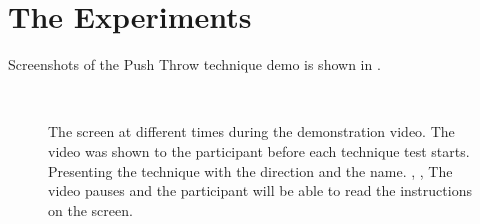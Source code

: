 \section*{The Experiments} \label{sec:experiments}

Screenshots of the Push Throw technique demo is shown in .

\begin{figure}[H]
\\
\caption{The screen at different times during the demonstration video. The video was shown to the participant before each technique test starts. \protect{} Presenting the technique with the direction and the name. \protect{}, \protect{}, \protect{} The video pauses and the participant will be able to read the instructions on the screen.}
\label{fig:demovideo}
\end{figure}